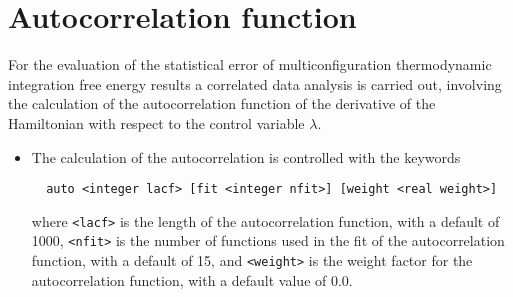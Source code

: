\section{Autocorrelation function}
For the evaluation of the statistical error of multiconfiguration
thermodynamic integration free energy results a correlated data 
analysis is carried out, involving the calculation of the
autocorrelation function of the derivative of the Hamiltonian with
respect to the control variable $\lambda$.
\begin{itemize}
\item 
The calculation of the autocorrelation is controlled with the keywords
\begin{verbatim}
  auto <integer lacf> [fit <integer nfit>] [weight <real weight>]
\end{verbatim}
where \verb+<lacf>+ is the length of the autocorrelation function, with
a default of 1000, \verb+<nfit>+ is the number of functions used in the
fit of the autocorrelation function, with a default of 15, and
\verb+<weight>+ is the weight factor for the autocorrelation function,
with a default value of 0.0.
\end{itemize}

